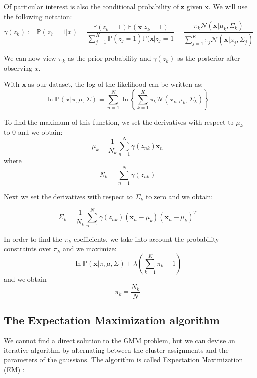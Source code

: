 Of particular interest is also the conditional probability of $\mathbf{z}$ given $\mathbf{x}$. We will use the following notation:
$$\gamma(z_k) := \mathbb{P}(z_k=1|x) = \frac{\mathbb{P}(z_k = 1) \mathbb{P}(\mathbf{x}|z_k = 1) }{\sum_{j=1}^{K} \mathbb{P}(z_j = 1) \mathbb{P}(\mathbf{x}|z_j = 1} = \frac{\pi_k \mathcal{N}(\mathbf{x}|\mu_k, \Sigma_k)}{\sum_{j=1}^{K} \pi_j \mathcal{N}(\mathbf{x}|\mu_j, \Sigma_j)}$$

We can now view $\pi_k$ as the prior probability and $\gamma(z_k)$ as the posterior after observing $x$.

With $\mathbf{x}$ as our dataset, the log of the likelihood can be written as:
$$ \ln \mathbb{P}(\mathbf{x}|\pi,\mu,\Sigma) = \sum_{n=1}^{N} \ln \left\{\sum_{k=1}^{K} \pi_k \mathcal{N}(\mathbf{x}_n|\mu_k,\Sigma_k)\right\} $$

To find the maximum of this function, we set the derivatives with respect to $\mu_k$ to 0 and we obtain:
$$ \mu_k = \frac{1}{N_k} \sum_{n=1}^{N}\gamma(z_{nk})\mathbf{x}_n $$
where
$$ N_k = \sum_{n=1}^{N} \gamma(z_{nk}) $$

Next we set the derivatives with respect to $\Sigma_k$ to zero and we obtain:

$$ \Sigma_k = \frac{1}{N_k} \sum_{n=1}^{N}\gamma(z_{nk})(\mathbf{x}_n - \mu_k)(\mathbf{x}_n - \mu_k)^T $$

In order to find the $\pi_k$ coefficients, we take into account the probability constraints over $\pi_k$ and we maximize:
$$ \ln \mathbb{P}(\mathbf{x}|\pi, \mu, \Sigma) + \lambda \left(\sum_{k=1}^{K} \pi_k - 1 \right)$$
and we obtain
$$ \pi_k = \frac{N_k}{N} $$

\subsection*{The Expectation Maximization algorithm}

We cannot find a direct solution to the GMM problem, but we can devise an iterative algorithm by alternating between the cluster assignments and the parameters of the gaussians. The algorithm is called Expectation Maximization (EM) \cite{Dempster1977}:



